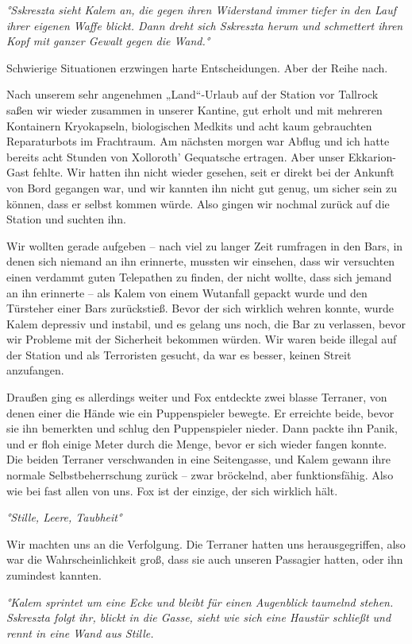 \documentclass[11pt]{article}
\begin{document}
\emph{°Sskreszta sieht Kalem an, die gegen ihren Widerstand immer tiefer
in den Lauf ihrer eigenen Waffe blickt. Dann dreht sich Sskreszta herum
und schmettert ihren Kopf mit ganzer Gewalt gegen die Wand.°}

Schwierige Situationen erzwingen harte Entscheidungen. Aber der Reihe
nach.

Nach unserem sehr angenehmen „Land``-Urlaub auf der Station vor Tallrock
saßen wir wieder zusammen in unserer Kantine, gut erholt und mit
mehreren Kontainern Kryokapseln, biologischen Medkits und acht kaum
gebrauchten Reparaturbots im Frachtraum. Am nächsten morgen war Abflug
und ich hatte bereits acht Stunden von Xolloroth' Gequatsche ertragen.
Aber unser Ekkarion-Gast fehlte. Wir hatten ihn nicht wieder gesehen,
seit er direkt bei der Ankunft von Bord gegangen war, und wir kannten
ihn nicht gut genug, um sicher sein zu können, dass er selbst kommen
würde. Also gingen wir nochmal zurück auf die Station und suchten ihn.

Wir wollten gerade aufgeben -- nach viel zu langer Zeit rumfragen in den
Bars, in denen sich niemand an ihn erinnerte, mussten wir einsehen, dass
wir versuchten einen verdammt guten Telepathen zu finden, der nicht
wollte, dass sich jemand an ihn erinnerte -- als Kalem von einem
Wutanfall gepackt wurde und den Türsteher einer Bars zurückstieß. Bevor
der sich wirklich wehren konnte, wurde Kalem depressiv und instabil, und
es gelang uns noch, die Bar zu verlassen, bevor wir Probleme mit der
Sicherheit bekommen würden. Wir waren beide illegal auf der Station und
als Terroristen gesucht, da war es besser, keinen Streit anzufangen.

Draußen ging es allerdings weiter und Fox entdeckte zwei blasse
Terraner, von denen einer die Hände wie ein Puppenspieler bewegte. Er
erreichte beide, bevor sie ihn bemerkten und schlug den Puppenspieler
nieder. Dann packte ihn Panik, und er floh einige Meter durch die Menge,
bevor er sich wieder fangen konnte. Die beiden Terraner verschwanden in
eine Seitengasse, und Kalem gewann ihre normale Selbstbeherrschung
zurück -- zwar bröckelnd, aber funktionsfähig. Also wie bei fast allen
von uns. Fox ist der einzige, der sich wirklich hält.

\emph{°Stille, Leere, Taubheit°}

Wir machten uns an die Verfolgung. Die Terraner hatten uns
herausgegriffen, also war die Wahrscheinlichkeit groß, dass sie auch
unseren Passagier hatten, oder ihn zumindest kannten.

\emph{°Kalem sprintet um eine Ecke und bleibt für einen Augenblick
taumelnd stehen. Sskreszta folgt ihr, blickt in die Gasse, sieht wie
sich eine Haustür schließt und rennt in eine Wand aus Stille.}
\end{document}
